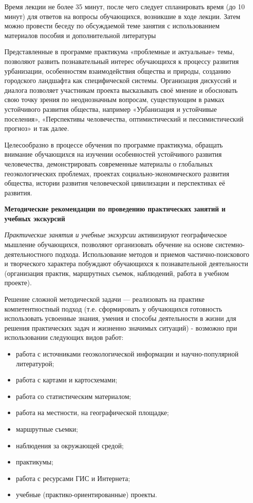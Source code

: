 \documentclass[
  11pt,
  russian,
]{book}
\begin{document}
Время лекции не более 35 минут, после чего следует спланировать время
(до 10 минут) для ответов на вопросы обучающихся, возникшие в ходе
лекции. Затем можно провести беседу по обсуждаемой теме занятия с
использованием материалов пособия и дополнительной литературы

Представленные в программе практикума «проблемные и актуальные» темы,
позволяют развить познавательный интерес обучающихся к процессу развития
урбанизации, особенностям взаимодействия общества и природы, созданию
городского ландшафта как специфической системы. Организация дискуссий и
диалога позволяет участникам проекта высказывать своё мнение и
обосновать свою точку зрения по неоднозначным вопросам, существующим в
рамках устойчивого развития общества, например «Урбанизация и устойчивые
поселения», «Перспективы человечества, оптимистический и
пессимистический прогноз» и так далее.

Целесообразно в процессе обучения по программе практикума, обращать
внимание обучающихся на изучении особенностей устойчивого развития
человечества, демонстрировать современные материалы о глобальных
геоэкологических проблемах, проектах социально-экономического развития
общества, истории развития человеческой циви­лизации и перспективах её
развития.

\textbf{Методические рекомендации по проведению практических занятий и
учебных экскурсий}

\emph{Практические занятия и учебные экскурсии} активизируют
географическое мышление обучающихся, позволяют организовать обучение на
основе системно-деятельностного подхода. Использование методов и приемов
частично-поискового и творческого характера побуждают обучающихся к
познавательной деятельности (организация практик, маршрутных съемок,
наблюдений, работа в учебном проекте).

Решение сложной методической задачи --- реализовать на практике
компетентностный подход (т.е. сформировать у обучающихся готовность
использовать усвоенные знания, умения и способы деятельности в жизни для
решения практических задач и жизненно значимых ситуаций) - возможно при
использовании следующих видов работ:

\begin{itemize}
\item
  работа с источниками геоэкологической информации и научно-популярной
  литературой;
\item
  работа с картами и картосхемами;
\item
  работа со статистическим материалом;
\item
  работа на местности, на географической площадке;
\item
  маршрутные съемки;
\item
  наблюдения за окружающей средой;
\item
  практикумы;
\item
  работа с ресурсами ГИС и Интернета;
\item
  учебные (практико-ориентированные) проекты.
\end{itemize}
\end{document}
